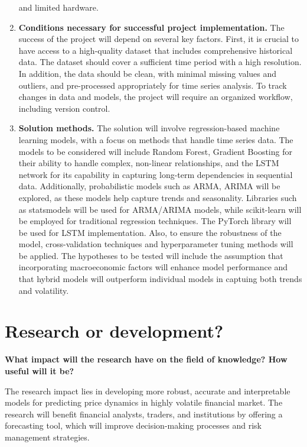 \documentclass[12pt]{article}
\begin{document}
\begin{enumerate}
and limited hardware.
\item \textbf{Conditions necessary for successful project implementation.} The success of the project will depend on several key factors. First, it
is crucial to have access to a high-quality dataset that includes comprehensive historical data. The dataset should cover a sufficient time period
with a high resolution. In addition, the data should be clean, with minimal missing values and outliers, and pre-processed appropriately for time
series analysis. To track changes in data and models, the project will require an organized workflow, including version control.
\item \textbf{Solution methods.} The solution will involve regression-based machine learning models, with a focus on methods that handle
time series data. The models to be considered will include Random Forest, Gradient Boosting for their ability to handle complex, non-linear
relationships, and the LSTM network for its capability in capturing long-term dependencies in sequential data. Additionally, probabilistic models
such as ARMA, ARIMA will be explored, as these models help capture trends and seasonality. Libraries such as statsmodels will be used for ARMA/ARIMA
models, while scikit-learn will be employed for traditional regression techniques. The PyTorch library will be used for LSTM implementation. Also, to
ensure the robustness of the model, cross-validation techniques and hyperparameter tuning methods will be applied. The hypotheses to be tested will
include the assumption that incorporating macroeconomic factors will enhance model performance and that hybrid models will outperform individual
models in captuing both trends and volatility.
\end{enumerate}

\section{Research or development?}

\textbf{What impact will the research have on the field of knowledge? How useful will it be?}

The research impact lies in developing more robust, accurate and interpretable models for predicting price dynamics in highly volatile financial
market. The research will benefit financial analysts, traders, and institutions by offering a forecasting tool, which will improve decision-making
processes and risk management strategies.

%
%
\end{document}
